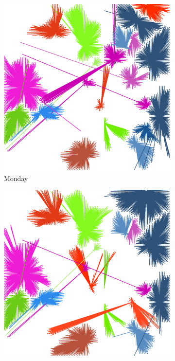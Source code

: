 \documentclass[12pt,a4paper]{article}
\begin{document}
\begin{figure}[H]
\centering
\begin{subfigure}[b]{0.48\textwidth}
\includegraphics[width=\textwidth]{weekDef/edges-1Mon-mid.png}
\caption{Monday}
\end{subfigure}
\begin{subfigure}[b]{0.48\textwidth}
\includegraphics[width=\textwidth]{weekDef/edges-2Tue-mid.png}

\end{subfigure}
\end{figure}
\end{document}
